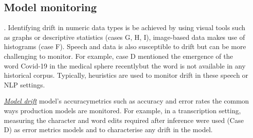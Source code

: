 \subsection{Model monitoring} 

\underline{\DIFdelbegin \emph{}%
\DIFdelend \DIFaddbegin \emph{}\DIFaddend } \DIFdelbegin {}\DIFdelend \DIFaddbegin {}\DIFaddend . Identifying drift in numeric data types is be achieved by using visual tools such as graphs or descriptive statistics (cases G, H, I), image-based data makes use of histograms (case F). Speech and \DIFdelbegin {}\DIFdelend \DIFaddbegin {}\DIFaddend data is also susceptible to drift but can be more challenging to monitor. For example, case D mentioned the emergence of the word Covid-19 in the medical sphere recently\DIFaddbegin \DIFadd{, }\DIFaddend but the word is not available in any historical corpus. Typically, heuristics are used to monitor drift in these speech or NLP settings.

\underline{\emph{Model drift}} \DIFdelbegin {}\DIFdelend \DIFaddbegin {}\DIFaddend model's accuracy\DIFdelbegin {}\DIFdelend \DIFaddbegin {}\DIFaddend metrics such as accuracy and error rates \DIFdelbegin {}\DIFdelend \DIFaddbegin {}\DIFaddend the common ways production models are monitored. For example, in a transcription setting, measuring the character and word edits required after inference were used (Case D) as error metrics \DIFdelbegin {}\DIFdelend \DIFaddbegin {}\DIFaddend models and to characterise any drift in the model.

